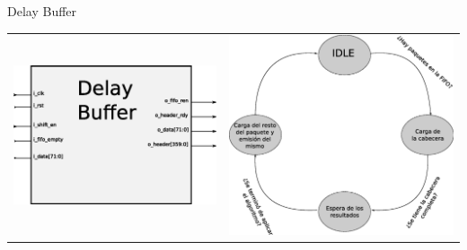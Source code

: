 \documentclass[xcolor=dvipsnames]{beamer}
\begin{document}
\begin{frame}{Delay Buffer}
 \begin{tabularx}{\linewidth}{Z|Z}
    \includegraphics[scale=0.40]{figures/bloqdelaybuffer.eps} 
    &
    \includegraphics[scale=0.25]{figures/estdelay.eps}
    \\
  \end{tabularx}

\end{frame}
\end{document}
